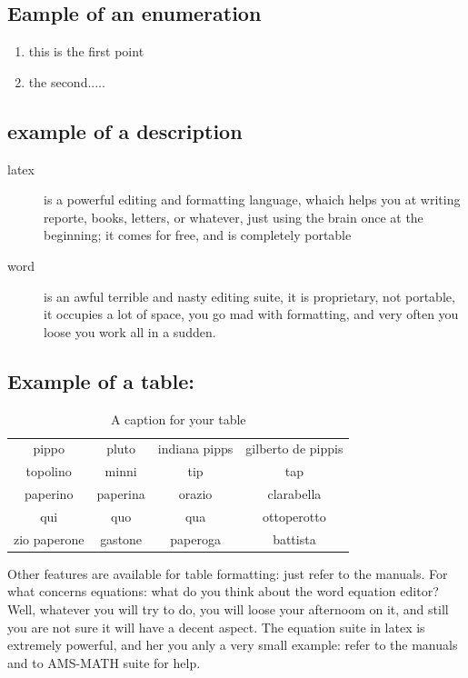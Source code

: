 \subsection{Eample of an enumeration}

\begin{enumerate}
\item this is the first point
\item the second.....
\end{enumerate}



\subsection{example of a description}
\begin{description}
\item[latex] is a powerful editing and formatting language, whaich helps you
at writing reporte, books, letters, or whatever, just using the brain 
once at the beginning; it comes for free, and is completely portable
\item[word] is an awful terrible and nasty editing suite, it is proprietary,
not portable, it occupies a lot of space, you go mad with formatting,
and very often you loose you work all in a sudden. 
\end{description}


\subsection{Example of a table:}

\begin{table}
\begin{center}
\begin{tabular}{|c|ccc|}
pippo & pluto & indiana pipps & gilberto de pippis \\
topolino & minni & tip & tap \\
paperino & paperina & orazio & clarabella \\
qui & quo & qua & ottoperotto \\
zio paperone & gastone & paperoga & battista \\  
\end{tabular}
\end{center}
\caption{A caption for your table}
\label{A-lable-for-your-table}
\end{table}


Other features are available for table formatting: just refer to the manuals.
For what concerns equations: what do you think about the word equation editor?
Well, whatever you will try to do, you will loose your afternoom on it, and
still you are not sure it will have a decent aspect. The equation suite
in latex is extremely powerful, and her you anly a very small example:
refer to the manuals and to AMS-MATH suite for help.


